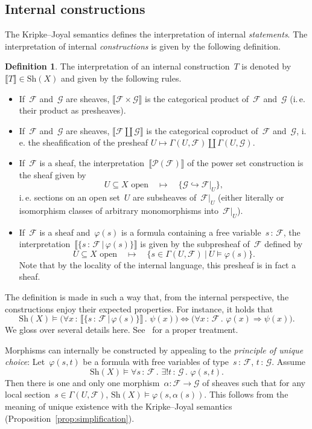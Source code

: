 \documentclass[10pt]{amsart}
\makeatletter
\theoremstyle{definition}
\newtheorem{defn}{Definition}[section]
\theoremstyle{plain}
\theoremstyle{remark}
\newcommand{\F}{\mathcal{F}}
\renewcommand{\G}{\mathcal{G}}
\renewcommand{\P}{\mathcal{P}}
\newcommand{\Sh}{\mathrm{Sh}}
\newcommand{\?}{\,{:}\,}
\renewcommand{\_}{\mathpunct{.}\,}
\newcommand{\brak}[1]{{\llbracket{#1}\rrbracket}}
\newcommand{\ie}{i.\,e.\@\xspace}
\makeatother
\begin{document}
\subsection{Internal constructions}
\label{sect:internal-constructions}
The Kripke--Joyal semantics defines the
interpretation of internal \emph{statements}. The interpretation of internal
\emph{constructions} is given by the following definition.

\begin{defn}The interpretation of an internal construction~$T$
is denoted by~$\brak{T} \in \Sh(X)$ and given by the following rules.
\begin{itemize}\item If~$\F$ and~$\G$ are sheaves, $\brak{\F \times \G}$ is the
categorical product of~$\F$ and~$\G$ (\ie their product as presheaves).
\item If~$\F$ and~$\G$ are sheaves, $\brak{\F \amalg \G}$ is the categorical
coproduct of~$\F$ and~$\G$, \ie the sheafification of the presheaf
$U \mapsto \Gamma(U,\F) \amalg \Gamma(U,\G)$.
\item If~$\F$ is a sheaf, the interpretation~$\brak{\P(\F)}$ of the power set
construction is the sheaf given by
\[ \text{$U \subseteq X$ open} \quad\longmapsto\quad \{ \G \hookrightarrow \F|_U \}, \]
\ie sections on an open set~$U$ are subsheaves of~$\F|_U$ (either literally
or isomorphism classes of arbitrary monomorphisms into~$\F|_U$).
\item If~$\F$ is a sheaf and~$\varphi(s)$ is a formula containing a free
variable~$s\?\F$, the interpretation~$\brak{\{s\?\F\,|\,\varphi(s)\}}$ is given
by the subpresheaf of~$\F$ defined by
\[ \text{$U \subseteq X$ open} \quad\longmapsto\quad \{ s \in \Gamma(U,\F) \ |\
  U \models \varphi(s) \}. \]
Note that by the locality of the internal language, this presheaf is in fact a
sheaf.
\end{itemize}
\end{defn}

The definition is made in such a way that, from the internal perspective, the
constructions enjoy their expected properties. For instance, it holds that
\[ \Sh(X) \models
  \bigl(\forall x\?\brak{\{s\?\F \,|\, \varphi(s)\}}\_ \psi(x)\bigr)
  \Longleftrightarrow
  \bigl(\forall x\?\F\_ \varphi(x) \Rightarrow \psi(x)\bigr). \]
We gloss over several details here. See~\cite[section~D4.1]{johnstone:elephant} for
a proper treatment.

Morphisms can internally be constructed by appealing to the \emph{principle of
unique choice}: Let~$\varphi(s,t)$ be a formula with free variables of
type~$s\?\F$, $t\?\G$. Assume
\[ \Sh(X) \models \forall s\?\F\_ \exists!t\?\G\_ \varphi(s,t). \]
Then there is one and only one morphism~$\alpha : \F \to \G$ of sheaves such
that for any local section~$s \in \Gamma(U,\F)$, $\Sh(X) \models
\varphi(s,\alpha(s))$. This follows from the meaning of unique existence with
the Kripke--Joyal semantics (Proposition~\ref{prop:simplification}).
\end{document}
